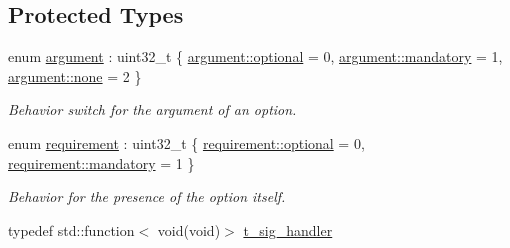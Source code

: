 \subsection*{Protected Types}
\begin{DoxyCompactItemize}
\item 
enum \hyperlink{classxtd_1_1Application_a672c075ed901e463609077d571a714c7}{argument} \+: uint32\+\_\+t \{ \hyperlink{classxtd_1_1Application_a672c075ed901e463609077d571a714c7ad57c24f3fe52d16e7169b912dd647f0d}{argument\+::optional} = 0, 
\hyperlink{classxtd_1_1Application_a672c075ed901e463609077d571a714c7ac5e3b9675d114c21ad3367d318f6aa95}{argument\+::mandatory} = 1, 
\hyperlink{classxtd_1_1Application_a672c075ed901e463609077d571a714c7a334c4a4c42fdb79d7ebc3e73b517e6f8}{argument\+::none} = 2
 \}\begin{DoxyCompactList}\small\item\em Behavior switch for the argument of an option. \end{DoxyCompactList}
\item 
enum \hyperlink{classxtd_1_1Application_a49c0397e9fd22067e3a536443a17fe24}{requirement} \+: uint32\+\_\+t \{ \hyperlink{classxtd_1_1Application_a49c0397e9fd22067e3a536443a17fe24ad57c24f3fe52d16e7169b912dd647f0d}{requirement\+::optional} = 0, 
\hyperlink{classxtd_1_1Application_a49c0397e9fd22067e3a536443a17fe24ac5e3b9675d114c21ad3367d318f6aa95}{requirement\+::mandatory} = 1
 \}\begin{DoxyCompactList}\small\item\em Behavior for the presence of the option itself. \end{DoxyCompactList}
\item 
typedef std\+::function$<$ void(void)$>$ \hyperlink{classxtd_1_1Application_a907b6fe8247636495890e668530863d6}{t\+\_\+sig\+\_\+handler}
\end{DoxyCompactItemize}
